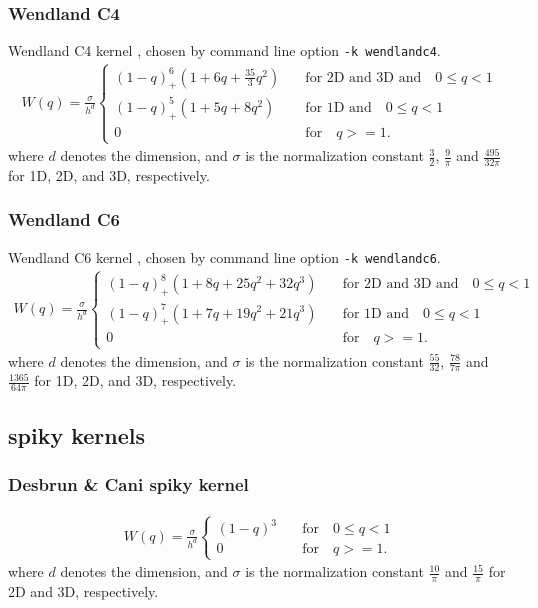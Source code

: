 \documentclass[10pt,fleqn,twoside]{article}
\begin{document}
\subsubsection{Wendland C4}
Wendland C4 kernel \citep{2012MNRAS.425.1068D}, chosen by command line option \texttt{-k
wendlandc4}.
\begin{align}
    W(q) = \frac{\sigma}{h^d} \left\{
    \begin{array}{ll}
        (1-q)_+^6 (1+6q+\frac{35}{3}q^2) & \quad \mbox{for 2D and 3D and} \quad 0 \leq  q < 1 \\
        (1-q)_+^5 (1+5q+8q^2) & \quad \mbox{for 1D and} \quad 0 \leq  q < 1 \\
        0 & \quad \mbox{for} \quad q >= 1.
    \end{array}
    \right.
\end{align}
where $d$ denotes the dimension, and $\sigma$ is the normalization constant $\frac{3}{2}$,
$\frac{9}{\pi}$ and $\frac{495}{32\pi}$ for 1D, 2D, and 3D, respectively.
\subsubsection{Wendland C6}
Wendland C6 kernel \citep{2012MNRAS.425.1068D}, chosen by command line option \texttt{-k
wendlandc6}.
\begin{align}
    W(q) = \frac{\sigma}{h^d} \left\{
    \begin{array}{ll}
        (1-q)_+^8 (1+8q+25q^2+32q^3) & \quad \mbox{for 2D and 3D and} \quad 0 \leq  q < 1 \\
        (1-q)_+^7 (1+7q+19q^2+21q^3) & \quad \mbox{for 1D and} \quad 0 \leq  q < 1 \\
        0 & \quad \mbox{for} \quad q >= 1.
    \end{array}
    \right.
\end{align}
where $d$ denotes the dimension, and $\sigma$ is the normalization constant $\frac{55}{32}$,
$\frac{78}{7\pi}$ and $\frac{1365}{64\pi}$ for 1D, 2D, and 3D, respectively.

\subsection{spiky kernels}
\subsubsection{Desbrun \& Cani spiky kernel}
\begin{align}
    W(q) = \frac{\sigma}{h^d} \left\{
    \begin{array}{ll}
        (1-q)^3  & \quad \mbox{for} \quad 0 \leq  q < 1 \\
        0 & \quad \mbox{for} \quad q >= 1.
    \end{array}
    \right.
\end{align}
where $d$ denotes the dimension, and $\sigma$ is the normalization constant
$\frac{10}{\pi}$ and $\frac{15}{\pi}$ for 2D and 3D, respectively.



\end{document}
